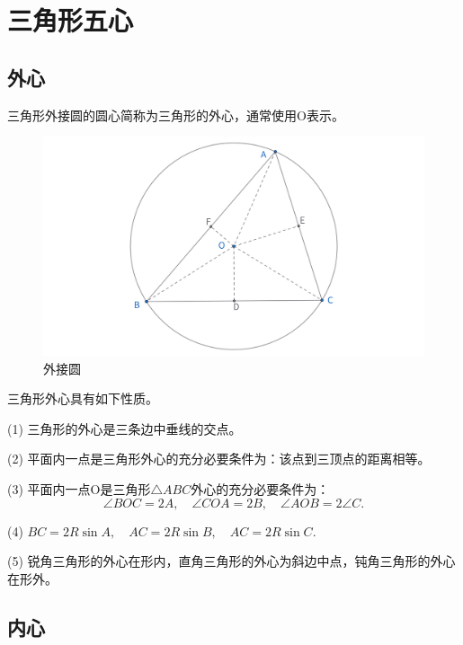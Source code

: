 \section{三角形五心}
\subsection{外心}

\begin{definition}[外心]
    三角形外接圆的圆心简称为三角形的外心，通常使用O表示。
\end{definition}

\begin{figure}[htbp]
    \centering
    \includegraphics[width=\linewidth]{figures/正弦定理.png}
    \caption{外接圆}
\end{figure}

\begin{proposition}[外心性质]
    三角形外心具有如下性质。
    
    (1) 三角形的外心是三条边中垂线的交点。

    (2) 平面内一点是三角形外心的充分必要条件为：该点到三顶点的距离相等。

    (3) 平面内一点O是三角形$\triangle ABC$外心的充分必要条件为：
    $$\angle BOC = 2A,\quad \angle COA = 2B,\quad \angle AOB =2\angle C.$$

    (4) $BC=2R\sin A,\quad AC =2R\sin B,\quad AC=2R\sin C.$

    (5) 锐角三角形的外心在形内，直角三角形的外心为斜边中点，钝角三角形的外心在形外。
\end{proposition}



\newpage 
\subsection{内心}

